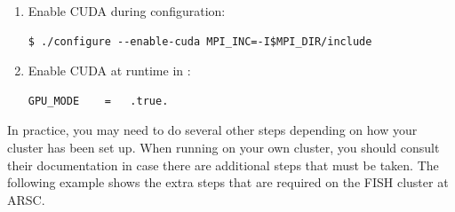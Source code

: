 \documentclass[10pt,fleqn,letterpaper]{article}
\begin{document}
\begin{enumerate}
\item Enable CUDA during configuration:
\begin{lstlisting}
$ ./configure --enable-cuda MPI_INC=-I$MPI_DIR/include
\end{lstlisting}

\item Enable CUDA at runtime in :
\begin{lstlisting}
GPU_MODE    =   .true.
\end{lstlisting}
\end{enumerate}

In practice, you may need to do several other steps depending on how your
cluster has been set up. When running on your own cluster, you should consult
their documentation in case there are additional steps that must be taken. The
following example shows the extra steps that are required on the FISH cluster
at ARSC.
\end{document}
